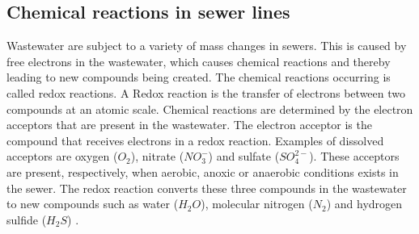 \subsection{Chemical reactions in sewer lines}\label{subse:chemical_reactions_in_a_sewer}
Wastewater are subject to a variety of mass changes in sewers. This is caused by free electrons in the wastewater, which causes chemical reactions and thereby leading to new compounds being created. %
The chemical reactions occurring is called redox reactions. %
A Redox reaction is the transfer of electrons between two compounds at an atomic scale.
Chemical reactions are determined by the electron acceptors that are present in the wastewater. 
The electron acceptor is the compound that receives electrons in a redox reaction.
Examples of dissolved acceptors are oxygen ($O_2$), nitrate ($NO^-_3$) and sulfate ($SO^{2-}_4$). These acceptors are present, respectively, when aerobic, anoxic or anaerobic conditions exists in the sewer. 
The redox reaction converts these three compounds in the wastewater to new compounds such as water ($H_2O$), molecular nitrogen ($N_2$) and hydrogen sulfide ($H_2S$) \cite{Sewer_processes}. 

